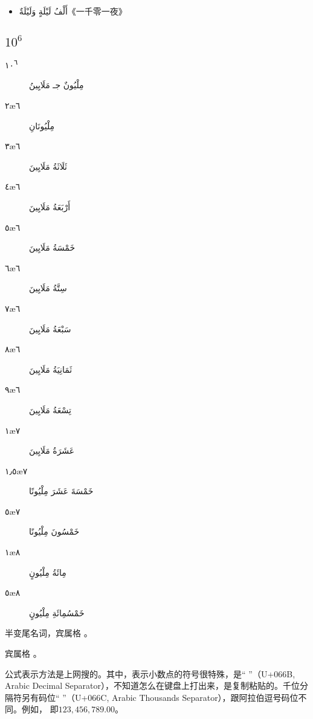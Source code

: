 \begin{itemize}
    \item \ac{أَلْفُ لَيْلَةٍ وَلَيْلَةٌ}{《一千零一夜》}
\end{itemize}

\subsection{$10^6$}

\begin{Arabic}
    \begin{multicols}{2}
        \begin{description}
            \item[١٠\textsuperscript{٦}] مِلْيُونٌ جـ مَلَايِينُ
            \item[٢\ae{٦}] مِلْيُونَانِ 
            \item[٣\ae{٦}] ثَلَاثَةُ مَلَايِينَ
            \item[٤\ae{٦}] أَرْبَعَةُ مَلَايِينَ
            \item[٥\ae{٦}] خَمْسَةُ مَلَايِينَ
            \item[٦\ae{٦}] سِتَّةُ مَلَايِينَ
            \item[٧\ae{٦}] سَبْعَةُ مَلَايِينَ
            \item[٨\ae{٦}] ثَمَانِيَةُ مَلَايِينَ
            \item[٩\ae{٦}] تِسْعَةُ مَلَايِينَ 
            \item[١\ae{٧}] عَشَرَةُ مَلَايِينَ
            \item[١٫٥\ae{٧}] خَمْسَةَ عَشَرَ مِلْيُونًا
            \item[٥\ae{٧}] خَمْسُونَ مِلْيُونًا
            \item[١\ae{٨}] مِائَةُ مِلْيُونٍ
            \item[٥\ae{٨}] خَمْسُمِائَةِ مِلْيُونٍ
        \end{description}
    \end{multicols}
\end{Arabic}

\begin{attention}
     半变尾名词，宾属格  。

     宾属格  。
\end{attention}

\begin{note}
    公式表示方法是上网搜的。其中，表示小数点的符号很特殊，是``  ''（U+066B, Arabic Decimal Separator），不知道怎么在键盘上打出来，是复制粘贴的。千位分隔符另有码位``  ''（U+066C, Arabic Thousands Separator），跟阿拉伯逗号码位不同。例如， 即$123,456,789.00$。
\end{note}


